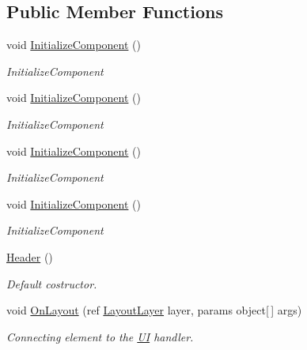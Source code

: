 \subsection*{Public Member Functions}
\begin{DoxyCompactItemize}
\item 
void \mbox{\hyperlink{class_wpf_handler_1_1_u_i_1_1_controls_1_1_header_a3bc7092e9a7ce867b8f29cad1c1d3f2f}{Initialize\+Component}} ()
\begin{DoxyCompactList}\small\item\em Initialize\+Component \end{DoxyCompactList}\item 
void \mbox{\hyperlink{class_wpf_handler_1_1_u_i_1_1_controls_1_1_header_a3bc7092e9a7ce867b8f29cad1c1d3f2f}{Initialize\+Component}} ()
\begin{DoxyCompactList}\small\item\em Initialize\+Component \end{DoxyCompactList}\item 
void \mbox{\hyperlink{class_wpf_handler_1_1_u_i_1_1_controls_1_1_header_a3bc7092e9a7ce867b8f29cad1c1d3f2f}{Initialize\+Component}} ()
\begin{DoxyCompactList}\small\item\em Initialize\+Component \end{DoxyCompactList}\item 
void \mbox{\hyperlink{class_wpf_handler_1_1_u_i_1_1_controls_1_1_header_a3bc7092e9a7ce867b8f29cad1c1d3f2f}{Initialize\+Component}} ()
\begin{DoxyCompactList}\small\item\em Initialize\+Component \end{DoxyCompactList}\item 
\mbox{\hyperlink{class_wpf_handler_1_1_u_i_1_1_controls_1_1_header_a58551b76c66c4da201070cf01d0561f6}{Header}} ()
\begin{DoxyCompactList}\small\item\em Default costructor. \end{DoxyCompactList}\item 
void \mbox{\hyperlink{class_wpf_handler_1_1_u_i_1_1_controls_1_1_header_a23ac86ea123581ee90d1aa9b6a81dadd}{On\+Layout}} (ref \mbox{\hyperlink{class_wpf_handler_1_1_u_i_1_1_auto_layout_1_1_layout_layer}{Layout\+Layer}} layer, params object\mbox{[}$\,$\mbox{]} args)
\begin{DoxyCompactList}\small\item\em Connecting element to the \mbox{\hyperlink{namespace_wpf_handler_1_1_u_i}{UI}} handler. \end{DoxyCompactList}\end{DoxyCompactItemize}
